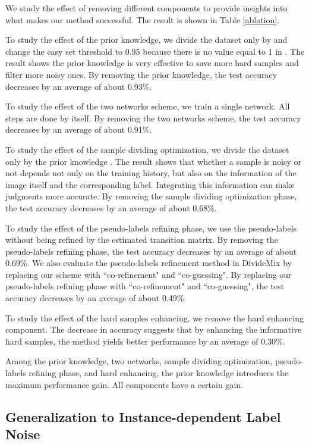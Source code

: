 \documentclass[letterpaper]{article} \usepackage{aaai22}  \usepackage{times}  \usepackage{helvet}  \usepackage{courier}  \usepackage[hyphens]{url}  \usepackage{graphicx} \urlstyle{rm} \def\UrlFont{\rm}  \usepackage{natbib}  \usepackage{caption} \DeclareCaptionStyle{ruled}{labelfont=normalfont,labelsep=colon,strut=off} \frenchspacing  \setlength{\pdfpagewidth}{8.5in}  \setlength{\pdfpageheight}{11in}  \usepackage{algorithm}
\begin{document}
We study the effect of removing different components to provide insights into what makes our method successful. The result is shown in Table \ref{ablation}.



To study the effect of the prior knowledge, we divide the dataset only by  and change the easy set threshold to 0.95 because there is no value equal to 1 in . The result shows the prior knowledge is very effective to save more hard samples and filter more noisy ones. By removing the prior knowledge, the test accuracy decreases by an average of about 0.93\%.

To study the effect of the two networks scheme, we train a single network. All steps are done by itself. By removing the two networks scheme, the test accuracy decreases by an average of about 0.91\%.

{To study the effect of the sample dividing optimization, we divide the dataset only by the prior knowledge . The result shows that whether a sample is noisy or not depends not only on the training history, but also on the information of the image itself and the corresponding label. Integrating this information can make judgments more accurate. By removing the sample dividing optimization phase, the test accuracy decreases by an average of about 0.68\%.}

To study the effect of the pseudo-labels refining phase, we use the pseudo-labels without being refined by the estimated transition matrix. By removing the pseudo-labels refining phase, the test accuracy decreases by an average of about 0.69\%. {We also evaluate the pseudo-labels refinement method in DivideMix \cite{2020DivideMix} by replacing our scheme with ``co-refinement" and ``co-guessing". By replacing our pseudo-labels refining phase with ``co-refinement" and ``co-guessing", the test accuracy decreases by an average of about 0.49\%.}

To study the effect of the hard samples enhancing, we remove the hard enhancing component. The decrease in accuracy suggests that by enhancing the informative hard samples, the method yields better performance by an average of 0.30\%.

{Among the prior knowledge, two networks, sample dividing optimization, pseudo-labels refining phase, and hard enhancing, the prior knowledge introduces the maximum performance gain. All components have a certain gain.}

\subsection{Generalization to Instance-dependent Label Noise}
\end{document}
